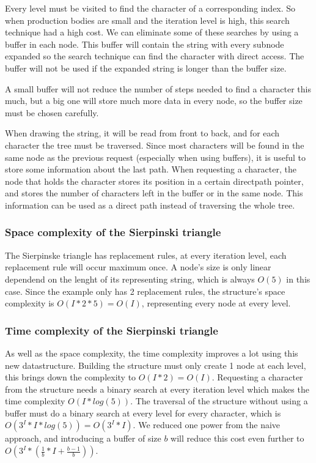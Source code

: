 \documentclass[11pt,a4paper]{article}
\begin{document}
Every level must be visited to find the character of a corresponding index. So when production bodies are small and the iteration level is high, this search technique had a high cost. We can eliminate some of these searches by using a buffer in each node. This buffer will contain the string with every subnode expanded so the search technique can find the character with direct access. The buffer will not be used if the expanded string is longer than the buffer size.

A small buffer will not reduce the number of steps needed to find a character this much, but a big one will store much more data in every node, so the buffer size must be chosen carefully.

When drawing the string, it will be read from front to back, and for each character the tree must be traversed. Since most characters will be found in the same node as the previous request (especially when using buffers), it is useful to store some information about the last path. When requesting a character, the node that holds the character stores its position in a certain directpath pointer, and stores the number of characters left in the buffer or in the same node. This information can be used as a direct path instead of traversing the whole tree.

\subsubsection{Space complexity of the Sierpinski triangle}
The Sierpinske triangle has replacement rules, at every iteration level, each replacement rule will occur maximum once. A node's size is only linear dependend on the lenght of its representing string, which is always $O(5)$ in this case. Since the example only has 2 replacement rules, the structure's space complexity is $O(I*2*5)=O(I)$, representing every node at every level.

\subsubsection{Time complexity of the Sierpinski triangle}
As well as the space complexity, the time complexity improves a lot using this new datastructure. Building the structure must only create 1 node at each level, this brings down the complexity to $O(I*2)=O(I)$. Requesting a character from the structure needs a binary search at every iteration level which makes the time complexity $O(I*log(5))$. The traversal of the structure without using a buffer must do a binary search at every level for every character, which is $O(3^I * I*log(5))=O(3^I * I)$. We reduced one power from the naive approach, and introducing a buffer of size $b$ will reduce this cost even further to $O(3^I * (\frac{1}{b}*I + \frac{b-1}{b}))$.
\end{document}
